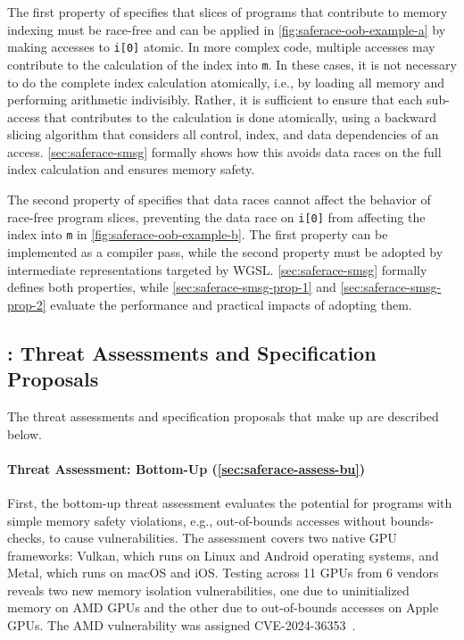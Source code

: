 The first property of \smsg specifies that slices of programs that contribute to memory indexing must be race-free and can be applied in \myfig\ref{fig:saferace-oob-example-a} by making accesses to \texttt{i[0]} atomic. In more complex code, multiple accesses may contribute to the calculation of the index into \texttt{m}. In these cases, it is not necessary to do the complete index calculation atomically, i.e., by loading all memory and performing arithmetic indivisibly. Rather, it is sufficient to ensure that each sub-access that contributes to the calculation is done atomically, using a backward slicing algorithm that considers all control, index, and data dependencies of an access. \mysec\ref{sec:saferace-smsg} formally shows how this avoids data races on the full index calculation and ensures memory safety.

The second property of \smsg specifies that data races cannot affect the behavior of race-free program slices, preventing the data race on \texttt{i[0]} from affecting the index into \texttt{m} in \myfig\ref{fig:saferace-oob-example-b}. The first property can be implemented as a compiler pass, while the second property must be adopted by intermediate representations targeted by WGSL. \mysec\ref{sec:saferace-smsg} formally defines both properties, while \mysec\ref{sec:saferace-smsg-prop-1} and \mysec\ref{sec:saferace-smsg-prop-2} evaluate the performance and practical impacts of adopting them.

\subsection{\saferace: Threat Assessments and Specification Proposals}

The threat assessments and specification proposals that make up \saferace are described below.

\paragraph{Threat Assessment: Bottom-Up (\mysec\ref{sec:saferace-assess-bu})}
First, the bottom-up threat assessment evaluates the potential for programs with simple memory safety violations, e.g., out-of-bounds accesses without bounds-checks, to cause vulnerabilities. The assessment covers two native GPU frameworks: Vulkan, which runs on Linux and Android operating systems, and Metal, which runs on macOS and iOS. Testing across 11 GPUs from 6 vendors reveals two new memory isolation vulnerabilities, one due to uninitialized memory on AMD GPUs and the other due to out-of-bounds accesses on Apple GPUs. The AMD vulnerability was assigned CVE-2024-36353~\cite{CVE-2024-36353}.

